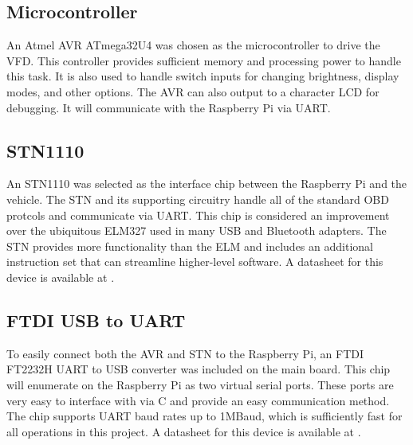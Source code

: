 \subsection{Microcontroller}
An Atmel AVR ATmega32U4 \cite{atmega32u4ds} was chosen as the microcontroller to drive the VFD.  This
controller provides sufficient memory and processing power to handle this task. 
It is also used to handle switch inputs for changing brightness, display modes,
and other options.  The AVR can also output to a character LCD
for debugging.  It will communicate with the Raspberry Pi via UART.

\subsection{STN1110}
An STN1110 was selected as the interface chip between the Raspberry Pi and the 
vehicle.  The STN and its supporting circuitry handle all of the standard OBD
protcols and communicate via UART.  This chip is considered an improvement over
the ubiquitous ELM327 used in many USB and Bluetooth adapters.  The STN provides
more functionality than the ELM and includes an additional instruction set that
can streamline higher-level software. A datasheet for this device is available
at \cite{stn1110ds}.

\subsection{FTDI USB to UART}
To easily connect both the AVR and STN to the Raspberry Pi, an FTDI FT2232H UART 
to USB converter was included on the main board.  This chip will enumerate on the
Raspberry Pi as two virtual serial ports.  These ports are very easy to interface
with via C and provide an easy communication method.  The chip supports UART baud
rates up to 1MBaud, which is sufficiently fast for all operations in this project.
A datasheet for this device is available at \cite{ft2232hds}.

